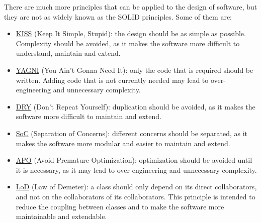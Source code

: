 There are much more principles that can be applied to the design of software, but they are not as widely known as the SOLID principles. Some of them are:
\begin{itemize}
    \item \ul{KISS} (Keep It Simple, Stupid): the design should be as simple as possible. Complexity should be avoided, as it makes the software more difficult to understand, maintain and extend.
    \item \ul{YAGNI} (You Ain't Gonna Need It): only the code that is required should be written. Adding code that is not currently needed may lead to over-engineering and unnecessary complexity.
    \item \ul{DRY} (Don't Repeat Yourself): duplication should be avoided, as it makes the software more difficult to maintain and extend.
    \item \ul{SoC} (Separation of Concerns): different concerns should be separated, as it makes the software more modular and easier to maintain and extend.
    \item \ul{APO} (Avoid Premature Optimization): optimization should be avoided until it is necessary, as it may lead to over-engineering and unnecessary complexity.
    \item \ul{LoD} (Law of Demeter): a class should only depend on its direct collaborators, and not on the collaborators of its collaborators. This principle is intended to reduce the coupling between classes and to make the software more maintainable and extendable.
\end{itemize}